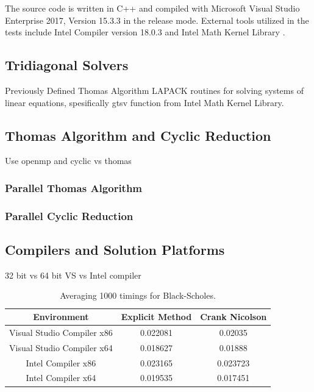 \documentclass[12pt, oneside]{book}
\theoremstyle{plain}
\theoremstyle{definition}
\begin{document}
The source code is written in C++ and compiled with Microsoft Visual Studio Enterprise 2017, Version 15.3.3 in the release mode. External tools  utilized  in  the  tests  include   Intel Compiler version 18.0.3 and Intel Math  Kernel  Library .  

\subsection{Tridiagonal Solvers}

Previously Defined Thomas Algorithm
LAPACK routines for solving systems of linear equations, spesifically gtsv function from Intel Math Kernel Library.

\subsection{Thomas Algorithm and Cyclic Reduction}
Use openmp and cyclic vs thomas
\subsubsection{Parallel Thomas Algorithm}
\subsubsection{Parallel Cyclic Reduction}


\subsection{Compilers and Solution Platforms}
32 bit vs 64 bit 
VS vs Intel compiler
\begin{table}[h!]
\centering
 \begin{tabular}{||c c c||} 
 \hline
 Environment & Explicit Method & Crank Nicolson\\ [0.5ex] 
 \hline\hline\hline
 Visual Studio Compiler x86 & 0.022081 & 0.02035\\ 
 Visual Studio Compiler x64 & 0.018627 & 0.01888\\
 Intel Compiler x86 & 0.023165 & 0.023723\\
 Intel Compiler x64 & 0.019535 & 0.017451\\ [1ex] 
 \hline
 \end{tabular}
 \caption{Averaging 1000 timings for Black-Scholes.}
\end{table}
\end{document}
